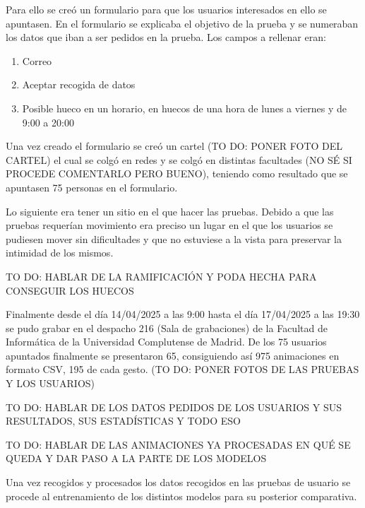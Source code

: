 Para ello se creó un formulario para que los usuarios interesados en ello se apuntasen. En el formulario se explicaba el objetivo de la prueba y se numeraban los datos que iban a ser pedidos en la prueba. Los campos a rellenar eran: 

\begin{enumerate}
	\item Correo
	\item Aceptar recogida de datos
	\item Posible hueco en un horario, en huecos de una hora de lunes a viernes y de 9:00 a 20:00
\end{enumerate}

Una vez creado el formulario se creó un cartel (TO DO: PONER FOTO DEL CARTEL) el cual se colgó en redes y se colgó en distintas facultades (NO SÉ SI PROCEDE COMENTARLO PERO BUENO), teniendo como resultado que se apuntasen 75 personas en el formulario.

Lo siguiente era tener un sitio en el que hacer las pruebas. Debido a que las pruebas requerían movimiento era preciso un lugar en el que los usuarios se pudiesen mover sin dificultades y que no estuviese a la vista para preservar la intimidad de los mismos.

TO DO: HABLAR DE LA RAMIFICACIÓN Y PODA HECHA PARA CONSEGUIR LOS HUECOS

Finalmente desde el día 14/04/2025 a las 9:00 hasta el día 17/04/2025 a las 19:30 se pudo grabar en el despacho 216 (Sala de grabaciones) de la Facultad de Informática de la Universidad Complutense de Madrid.
De los 75 usuarios apuntados finalmente se presentaron 65, consiguiendo así 975 animaciones en formato CSV, 195 de cada gesto. (TO DO: PONER FOTOS DE LAS PRUEBAS Y LOS USUARIOS)

TO DO: HABLAR DE LOS DATOS PEDIDOS DE LOS USUARIOS Y SUS RESULTADOS, SUS ESTADÍSTICAS Y TODO ESO

TO DO: HABLAR DE LAS ANIMACIONES YA PROCESADAS EN QUÉ SE QUEDA Y DAR PASO A LA PARTE DE LOS MODELOS

Una vez recogidos y procesados los datos recogidos en las pruebas de usuario se procede al entrenamiento de los distintos modelos para su posterior comparativa.